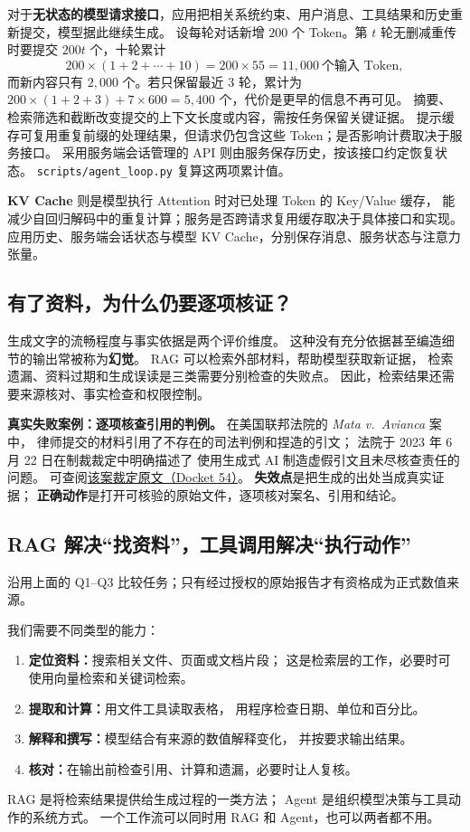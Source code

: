 对于\textbf{无状态的模型请求接口}，应用把相关系统约束、用户消息、工具结果和历史重新提交，模型据此继续生成。
设每轮对话新增 $200$ 个 Token。第 $t$ 轮无删减重传时要提交 $200t$ 个，十轮累计
\[
200\times(1+2+\cdots+10)=200\times55=\boxed{11{,}000}\ \text{个输入 Token},
\]
而新内容只有 $2{,}000$ 个。若只保留最近 $3$ 轮，累计为
$200\times(1+2+3)+7\times600=\boxed{5{,}400}$ 个，代价是更早的信息不再可见。
摘要、检索筛选和截断改变提交的上下文长度或内容，需按任务保留关键证据。
提示缓存可复用重复前缀的处理结果，但请求仍包含这些 Token；是否影响计费取决于服务接口。
采用服务端会话管理的 API 则由服务保存历史，按该接口约定恢复状态。
\texttt{scripts/agent\_loop.py} 复算这两项累计值。


\textbf{KV Cache} 则是模型执行 Attention 时对已处理 Token 的 Key/Value 缓存，
能减少自回归解码中的重复计算；服务是否跨请求复用缓存取决于具体接口和实现。
应用历史、服务端会话状态与模型 KV Cache，分别保存消息、服务状态与注意力张量。

\subsection{有了资料，为什么仍要逐项核证？}
\label{partq:assistant}

生成文字的流畅程度与事实依据是两个评价维度。
这种没有充分依据甚至编造细节的输出常被称为\textbf{幻觉}。
RAG 可以检索外部材料，帮助模型获取新证据，
检索遗漏、资料过期和生成误读是三类需要分别检查的失败点。
因此，检索结果还需要来源核对、事实检查和权限控制。

\begin{casebox}
\textbf{真实失败案例：逐项核查引用的判例。}
在美国联邦法院的 \emph{Mata v.\ Avianca} 案中，
律师提交的材料引用了不存在的司法判例和捏造的引文；
法院于 2023 年 6 月 22 日在制裁裁定中明确描述了
使用生成式 AI 制造虚假引文且未尽核查责任的问题。
可查阅\href{https://law.justia.com/cases/federal/district-courts/new-york/nysdce/1:2022cv01461/575368/54/}{该案裁定原文（Docket 54）}。
\textbf{失效点}是把生成的出处当成真实证据；
\textbf{正确动作}是打开可核验的原始文件，逐项核对案名、引用和结论。
\end{casebox}

\subsection{RAG 解决“找资料”，工具调用解决“执行动作”}

沿用上面的 Q1--Q3 比较任务；只有经过授权的原始报告才有资格成为正式数值来源。

我们需要不同类型的能力：
\begin{enumerate}
\item \textbf{定位资料：}搜索相关文件、页面或文档片段；
这是检索层的工作，必要时可使用向量检索和关键词检索。
\item \textbf{提取和计算：}用文件工具读取表格，
用程序检查日期、单位和百分比。
\item \textbf{解释和撰写：}模型结合有来源的数值解释变化，
并按要求输出结果。
\item \textbf{核对：}在输出前检查引用、计算和遗漏，必要时让人复核。
\end{enumerate}
RAG 是将检索结果提供给生成过程的一类方法；
Agent 是组织模型决策与工具动作的系统方式。
一个工作流可以同时用 RAG 和 Agent，也可以两者都不用。


